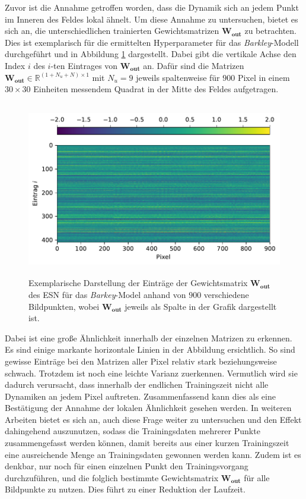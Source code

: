 Zuvor ist die Annahme getroffen worden, dass die Dynamik sich an jedem Punkt im Inneren des Feldes lokal ähnelt. Um diese Annahme zu untersuchen, bietet es sich an, die unterschiedlichen trainierten Gewichtsmatrizen $\mathbf{W_{out}}$ zu betrachten. Dies ist exemplarisch für die ermittelten Hyperparameter für das \textit{Barkley}-Modell durchgeführt und in Abbildung \ref{fig:exp_cross_esn_weights} dargestellt. Dabei gibt die vertikale Achse den Index $i$ des $i$-ten Eintrages von $\mathbf{W_{out}}$ an. Dafür sind die Matrizen $\mathbf{W_{out}} \in \mathbb{R}^{(1 + N_u + N) \times 1}$ mit $N_u = 9$ jeweils spaltenweise für $900$ Pixel in einem $30 \times 30$ Einheiten messendem Quadrat in der Mitte des Feldes aufgetragen.

\begin{figure}[H]
	\centering
	\includegraphics[height=3.0in]{figures/results/cross_prediction/weights.pdf}
	\setcapmargin[1cm]{1cm}
	\caption{Exemplarische Darstellung der Einträge der Gewichtsmatrix $\mathbf{W_{out}}$ des \textsc{ESN} für das \textit{Barkey}-Model anhand von $900$ verschiedene Bildpunkten, wobei $\mathbf{W_{out}}$ jeweils als Spalte in der Grafik dargestellt ist.}
	\label{fig:exp_cross_esn_weights}
\end{figure}

Dabei ist eine große Ähnlichkeit innerhalb der einzelnen Matrizen zu erkennen. Es sind einige markante horizontale Linien in der Abbildung ersichtlich. So sind gewisse Einträge bei den Matrizen aller Pixel relativ stark beziehungsweise schwach. Trotzdem ist noch eine leichte Varianz zuerkennen. Vermutlich wird sie dadurch verursacht, dass innerhalb der endlichen Trainingszeit nicht alle Dynamiken an jedem Pixel auftreten. Zusammenfassend kann dies als eine Bestätigung der Annahme der lokalen Ähnlichkeit gesehen werden. In weiteren Arbeiten bietet es sich an, auch diese Frage weiter zu untersuchen und den Effekt dahingehend auszunutzen, sodass die Trainingsdaten mehrerer Punkte zusammengefasst werden können, damit bereits aus einer kurzen Trainingszeit eine ausreichende Menge an Trainingsdaten gewonnen werden kann. Zudem ist es denkbar, nur noch für einen einzelnen Punkt den Trainingsvorgang durchzuführen, und die folglich bestimmte Gewichtsmatrix $\mathbf{W_{out}}$ für alle Bildpunkte zu nutzen. Dies führt zu einer Reduktion der Laufzeit.

